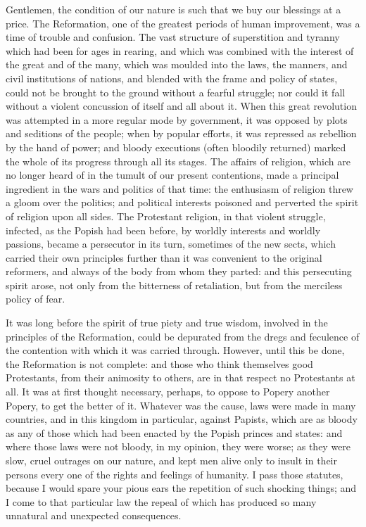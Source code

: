 Gentlemen, the condition of our nature is such that we buy our blessings at a price. The Reformation, one of the greatest periods of human improvement, was a time of trouble and confusion. The vast structure of superstition and tyranny which had been for ages in rearing, and which was combined with the interest of the great and of the many, which was moulded into the laws, the manners, and civil institutions of nations, and blended with the frame and policy of states, could not be brought to the ground without a fearful struggle; nor could it fall without a violent concussion of itself and all about it. When this great revolution was attempted in a more regular mode by government, it was opposed by plots and seditions of the people; when by popular efforts, it was repressed as rebellion by the hand of power; and bloody executions (often bloodily returned) marked the whole of its progress through all its stages. The affairs of religion, which are no longer heard of in the tumult of our present contentions, made a principal ingredient in the wars and politics of that time: the enthusiasm of religion threw a gloom over the politics; and political interests poisoned and perverted the spirit of religion upon all sides. The Protestant religion, in that violent struggle, infected, as the Popish had been before, by worldly interests and worldly passions, became a persecutor in its turn, sometimes of the new sects, which carried their own principles further than it was convenient to the original reformers, and always of the body from whom they parted: and this persecuting spirit arose, not only from the bitterness of retaliation, but from the merciless policy of fear.

It was long before the spirit of true piety and true wisdom, involved in the principles of the Reformation, could be depurated from the dregs and feculence of the contention with which it was carried through. However, until this be done, the Reformation is not complete: and those who think themselves good Protestants, from their animosity to others, are in that respect no Protestants at all. It was at first thought necessary, perhaps, to oppose to Popery another Popery, to get the better of it. Whatever was the cause, laws were made in many countries, and in this kingdom in particular, against Papists, which are as bloody as any of those which had been enacted by the Popish princes and states: and where those laws were not bloody, in my opinion, they were worse; as they were slow, cruel outrages on our nature, and kept men alive only to insult in their persons every one of the rights and feelings of humanity. I pass those statutes, because I would spare your pious ears the repetition of such shocking things; and I come to that particular law the repeal of which has produced so many unnatural and unexpected consequences.

